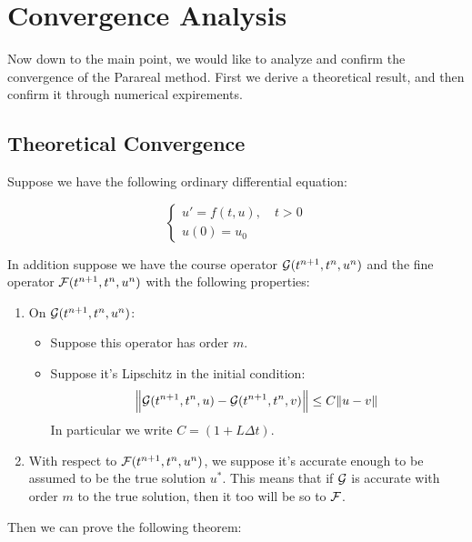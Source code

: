 \section{Convergence Analysis}

Now down to the main point, we would like to analyze and confirm the convergence
of the Parareal method. First we derive a theoretical result, and then confirm
it through numerical expirements.

\subsection{Theoretical Convergence}

Suppose we have the following ordinary differential equation:

\begin{equation}
  \begin{cases}
    u' = f(t,u), \quad t > 0 \\
    u(0) = u_0
  \end{cases}
\end{equation}

In addition suppose we have the course operator $\mathcal{G}(t^{n+1},t^n,u^n)$ and
the fine operator $\mathcal{F}(t^{n+1}, t^n, u^n)$ with the following properties:

\begin{enumerate}
  \item On $\mathcal{G}(t^{n+1},t^n,u^n)$:
    \begin{itemize}
      \item Suppose this operator has order $m$.
      \item Suppose it's Lipschitz in the initial condition:
        \[
          \norm{\mathcal{G}(t^{n+1},t^n,u)-\mathcal{G}(t^{n+1},t^n,v)} \leq 
          C\norm{u - v} 
        \]
        In particular we write $C = (1 + L \Delta t)$.
    \end{itemize}
  \item With respect to $\mathcal{F}(t^{n+1}, t^n, u^n)$, we suppose it's accurate
    enough to be assumed to be the true solution $u^*$. This means that if
    $\mathcal{G}$ is accurate with order $m$ to the true solution, then it too will
    be so to $\mathcal{F}$.
\end{enumerate}

Then we can prove the following theorem:

